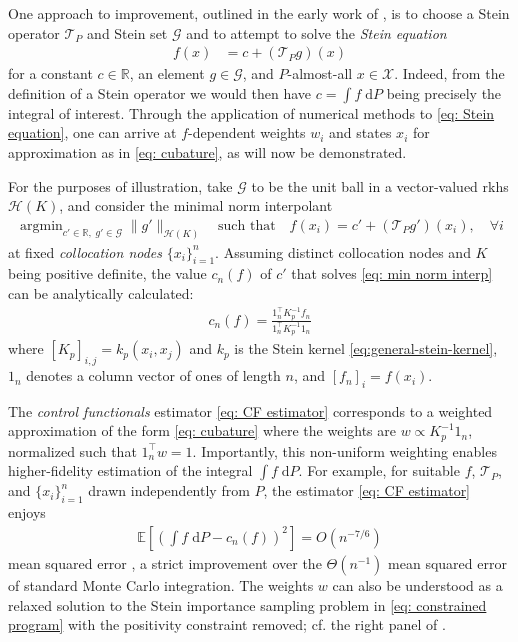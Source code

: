 \documentclass[12pt,paper=letter]{scrreprt}
\def\mbb#1{\mathbb{#1}}
\def\E{\mbb{E}} %
\providecommand{\argmin}{\mathop\mathrm{arg min}}
\begin{document}
One approach to improvement, outlined in the early work of \citet{stein1986approximate}, is to choose a Stein operator $\mathcal{T}_P$ and Stein set $\mathcal{G}$ and to attempt to solve the \emph{Stein equation}
\begin{align}
    f(x) & = c + (\mathcal{T}_P g)(x) \label{eq: Stein equation}
\end{align}
for a constant $c \in \mathbb{R}$, an element $g\in\mathcal{G}$, and $P$-almost-all $x \in \mathcal{X}$.
Indeed, from the definition of a Stein operator we would then have $c = \int f \; \mathrm{d}P$ being precisely the integral of interest.
Through the application of numerical methods to \eqref{eq: Stein equation}, one can arrive at $f$-dependent weights $w_i$ and states $x_i$ for approximation as in \eqref{eq: cubature}, as will now be demonstrated.

For the purposes of illustration, take $\mathcal{G}$ to be the unit ball in a vector-valued \ac{rkhs} $\mathcal{H}(K)$, and consider the minimal norm interpolant
\begin{align}
    \argmin_{c' \in \mathbb{R} , \; g' \in \mathcal{G}}  \|g'\|_{\mathcal{H}(K)} \quad \text{such that} \quad f(x_i) = c' + (\mathcal{T}_P g')(x_i), \quad \forall i \label{eq: min norm interp}
\end{align}
at fixed \emph{collocation nodes} $\{x_i\}_{i=1}^n$.
Assuming distinct collocation nodes and $K$ being positive definite, the value $c_n(f)$ of $c'$ that solves \eqref{eq: min norm interp} can be analytically calculated:
\begin{align}
    c_n(f) = \frac{1_n^\top K_p^{-1} f_n}{1_n^\top K_p^{-1} 1_n} \label{eq: CF estimator}
\end{align}
where $[K_p]_{i,j} = k_p(x_i,x_j)$ and $k_p$ is the Stein kernel \eqref{eq:general-stein-kernel}, $1_n$ denotes a column vector of ones of length $n$, and $[f_n]_i = f(x_i)$.

The \emph{control functionals} estimator \eqref{eq: CF estimator} corresponds to a weighted approximation of the form \eqref{eq: cubature} where the weights are $w \propto K_p^{-1} 1_n$, normalized such that $1_n^\top w = 1$. 
Importantly, this non-uniform weighting enables higher-fidelity estimation of the integral $\int f \; \mathrm{d}P$. For example, for suitable $f$, $\mathcal{T}_P$, and $\{x_i\}_{i=1}^n$ drawn independently from $P$, the estimator \eqref{eq: CF estimator} enjoys
\begin{align}
\E\left[\left(\int f \; \mathrm{d}P - c_n(f)\right)^2\right] = O(n^{-7/6})
\end{align} 
mean squared error \citep[Thm.~2]{oates2017control}, a strict improvement over the $\Theta(n^{-1})$ mean squared error of standard Monte Carlo integration. 
The weights $w$ can also be understood as a relaxed solution to the Stein importance sampling problem in \eqref{eq: constrained program} with the positivity constraint removed; cf. the right panel of . 
\end{document}
